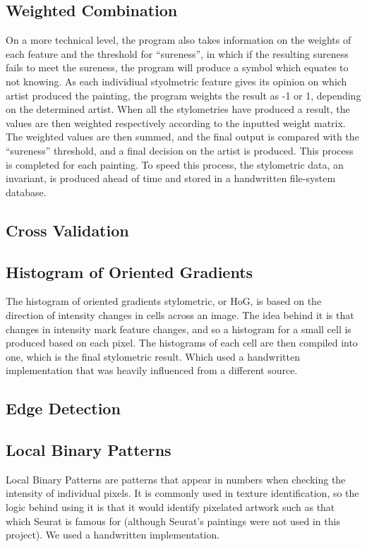 \documentclass[twocolumn]{article}
\begin{document}
  \subsection{Weighted Combination}
  On a more technical level, the program also takes information on the weights
  of each feature and the threshold for ``sureness'', in which if the resulting
  sureness fails to meet the sureness, the program will produce a symbol which
  equates to not knowing. As each individiual styolmetric feature gives its
  opinion on which artist produced the painting, the program weights the result
  as -1 or 1, depending on the determined artist. When all the stylometries have
  produced a result, the values are then weighted respectively according to the
  inputted weight matrix. The weighted values are then summed, and the final
  output is compared with the ``sureness'' threshold, and a final decision on
  the artist is produced. This process is completed for each painting. To speed
  this process, the stylometric data, an invariant, is produced ahead of time
  and stored in a handwritten file-system database. \\

  \subsection{Cross Validation}

  \subsection{Histogram of Oriented Gradients}
  The histogram of oriented gradients stylometric, or HoG, is based on the
  direction of intensity changes in cells across an image. The idea behind it is
  that changes in intensity mark feature changes, and so a histogram for a small
  cell is produced based on each pixel. The histograms of each cell are then
  compiled into one, which is the final stylometric result. Which used a
  handwritten implementation that was heavily influenced from a different
  source.

  \subsection{Edge Detection}

  \subsection{Local Binary Patterns}
  Local Binary Patterns are patterns that appear in numbers when checking the
  intensity of individual pixels. It is commonly used in texture identification,
  so the logic behind using it is that it would identify pixelated artwork such
  as that which Seurat is famous for (although Seurat's paintings were not used
  in this project). We used a handwritten implementation.
\end{document}
